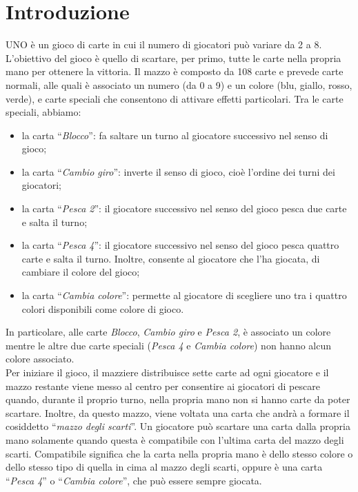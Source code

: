 \documentclass[11pt]{article} %
\begin{document}
\section{Introduzione}
UNO è un gioco di carte in cui il numero di giocatori può variare da 2 a 8. L'obiettivo del gioco è quello di scartare, per primo, tutte le carte nella 
propria mano per ottenere la vittoria. 
Il mazzo è composto da 108 carte e prevede carte normali, alle quali è associato un numero (da 0 a 9) e un colore (blu, giallo, rosso, verde), e carte speciali
che consentono di attivare effetti particolari. Tra le carte speciali, abbiamo:
\begin{itemize}
 \item la carta ``\emph{Blocco}'': fa saltare un turno al giocatore successivo nel senso di gioco;
 \item la carta ``\emph{Cambio giro}'': inverte il senso di gioco, cioè l'ordine dei turni dei giocatori;
 \item la carta ``\emph{Pesca 2}'': il giocatore successivo nel senso del gioco pesca due carte e salta il turno;
 \item la carta ``\emph{Pesca 4}'': il giocatore successivo nel senso del gioco pesca quattro carte e salta il turno. Inoltre, consente al giocatore che l'ha
 giocata, di cambiare il colore del gioco; 
 \item la carta ``\emph{Cambia colore}'': permette al giocatore di scegliere uno tra i quattro colori disponibili come colore di gioco.
\end{itemize}
In particolare, alle carte \emph{Blocco}, \emph{Cambio giro} e \emph{Pesca 2}, è associato un colore mentre le altre due carte speciali (\emph{Pesca 4} e 
\emph{Cambia colore}) non hanno alcun colore associato.\\
Per iniziare il gioco, il mazziere distribuisce sette carte ad ogni giocatore e il mazzo restante viene
messo al centro per consentire ai giocatori di pescare quando, durante il proprio turno, nella propria mano non si hanno carte da poter scartare. 
Inoltre, da questo mazzo, viene voltata una carta che andrà a formare il cosiddetto ``\emph{mazzo degli scarti}''. 
Un giocatore può scartare una carta dalla propria mano solamente quando questa è compatibile con l'ultima carta del mazzo degli scarti. 
Compatibile significa che la carta nella propria mano è dello stesso colore o dello stesso tipo di quella in cima
al mazzo degli scarti, oppure è una carta ``\emph{Pesca 4}'' o ``\emph{Cambia colore}'', che può essere sempre giocata.\\
\end{document}
